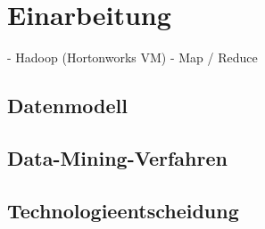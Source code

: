\section{Einarbeitung}
- Hadoop (Hortonworks VM)
- Map / Reduce

\subsection{Datenmodell}

\subsection{Data-Mining-Verfahren}

\subsection{Technologieentscheidung}